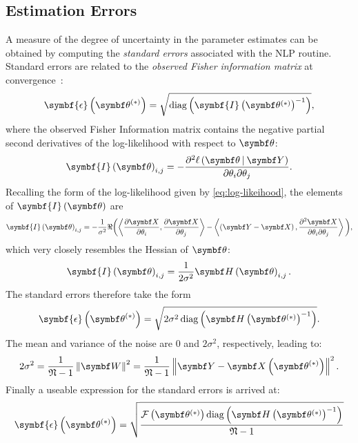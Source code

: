 \subsection{Estimation Errors}
\label{subsec:errors}
A measure of the degree of uncertainty in the parameter estimates can be obtained
by computing the \emph{standard errors} associated with the \ac{NLP} routine.
Standard errors are related  to the \emph{observed Fisher information matrix}
at convergence~\cite[Section 2.7]{Pawitan2001}:
\begin{equation}
    \symbf{\epsilon}\left(\bthstar\right) = \sqrt{\diag\left(\symbf{I}\left( \bthstar \right)^{-1}\right)},
\end{equation}
where the observed Fisher Information matrix contains the negative partial second
derivatives of the log-likelihood with respect to $\bth$:
\begin{equation}
    \symbf{I}\left(\bth\right)_{i, j} =
        -\frac
        {\partial^2 \ell \left( \bdthY \right)}
        {\partial \theta_i \partial \theta_j}.
\end{equation}
Recalling the form of the log-likelihood given by \cref{eq:log-likeihood},
the elements of $\symbf{I}\left(\bth\right)$ are
\begin{equation}
    \symbf{I}\left(\bth\right)_{i, j} =
        -\frac{1}{\sigma^2}
        \Re
        \biggl(
            \left\langle
                \frac{\partial \bX}{\partial \theta_i},
                \frac{\partial \bX}{\partial \theta_j}
            \right\rangle
            -
            \left\langle
                \left(\bY - \bX\right),
                \frac{\partial^2 \bX}{\partial \theta_i \partial \theta_j}
            \right\rangle
        \biggl),
\end{equation}
which very closely resembles the Hessian of $\bth$:
\begin{equation}
    \symbf{I}\left(\bth\right)_{i,j} =
        \frac{1}{2 \sigma^2}
            \bdHth_{i,j}.
\end{equation}
The standard errors therefore take the form
\begin{equation}
    \symbf{\epsilon}\left(\bthstar\right) =
        \sqrt{
            2\sigma^2 \diag \left(
                \bdHthstar^{-1}
            \right)
        }.
\end{equation}
The mean and variance of the noise are $0$ and $2\sigma^2$, respectively,
leading to:
\begin{equation}
    2 \sigma^2 = \frac{1}{\mathfrak{N} - 1}
    \left\lVert \bW \right\rVert^2 =
    \frac{1}{\mathfrak{N} - 1} \left \lVert
        \bY - \bXthstar
    \right \rVert^2.
\end{equation}
Finally a useable expression for the standard errors is arrived at:
\begin{equation}
    \symbf{\epsilon}\left(\bthstar\right) =
        \sqrt{
            \frac
            {
                \Fthstar \diag \left(
                    \bdHthstar^{-1}
                \right)
            }
            {\mathfrak{N} - 1}
        }
\end{equation}



